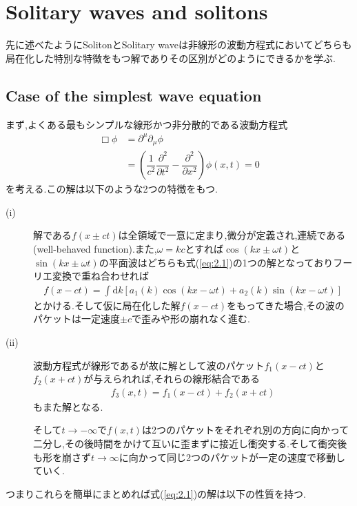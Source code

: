 \documentclass[dvipdfmx,11pt,a4paper,oneside,openany]{jsbook}
\begin{document}
\section{Solitary waves and solitons}
先に述べたようにSolitonとSolitary waveは非線形の波動方程式においてどちらも局在化した特別な特徴をもつ解でありその区別がどのようにできるかを学ぶ.

\subsection{Case of the simplest wave equation}
まず,よくある最もシンプルな線形かつ非分散的である波動方程式
\begin{align}
    \Box\phi & =\partial^{\mu}\partial_{\mu}\phi\nonumber                                                                             \\
             & =\left(\dfrac{1}{c^2}\dfrac{\partial^2}{\partial t^2}-\dfrac{\partial^2}{\partial x^2}\right)\phi(x,t)=0\label{eq:2.1}
\end{align}
を考える.この解は以下のような2つの特徴をもつ.
\begin{description}
    \item[(i)] 解である$f(x\pm ct)$は全領域で一意に定まり,微分が定義され,連続である(well-behaved function).また,$\omega=kc$とすれば$\cos(kx\pm \omega t)$と$\sin(kx\pm \omega t)$の平面波はどちらも式(\ref{eq:2.1})の1つの解となっておりフーリエ変換で重ね合わせれば
          \begin{align}
              f(x-c t)=\int \mathrm{d} k\left[a_{1}(k) \cos (k x-\omega t)+a_{2}(k) \sin (k x-\omega t)\right]
          \end{align}
          とかける.そして仮に局在化した解$f(x-ct)$をもってきた場合,その波のパケットは一定速度$\pm c$で歪みや形の崩れなく進む.
    \item[(ii)] 波動方程式が線形であるが故に解として波のパケット$f_1(x-ct)$と$f_2(x+ct)$が与えられれば,それらの線形結合である
          \begin{align*}
              f_3(x,t)=f_1(x-ct)+f_2(x+ct)
          \end{align*}
          もまた解となる.

          そして$t\rightarrow-\infty$で$f(x,t)$は2つのパケットをそれぞれ別の方向に向かって二分し,その後時間をかけて互いに歪まずに接近し衝突する.そして衝突後も形を崩さず$t\rightarrow\infty$に向かって同じ2つのパケットが一定の速度で移動していく.
\end{description}
つまりこれらを簡単にまとめれば式(\ref{eq:2.1})の解は以下の性質を持つ.
\end{document}
